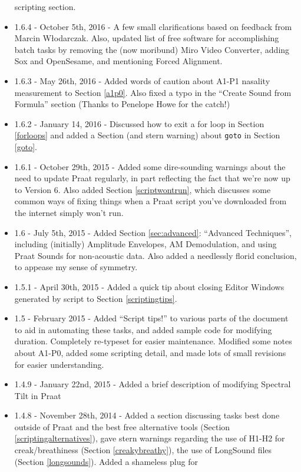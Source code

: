 \documentclass[11pt]{article}
\begin{document}
\begin{itemize}
  scripting section.
\item
  1.6.4 - October 5th, 2016 - A few small clarifications based on
  feedback from Marcin Włodarczak. Also, updated list of free software
  for accomplishing batch tasks by removing the (now moribund) Miro
  Video Converter, adding Sox and OpenSesame, and mentioning Forced
  Alignment.
\item
  1.6.3 - May 26th, 2016 - Added words of caution about A1-P1 nasality
  measurement to Section \ref{a1p0}. Also fixed a typo in the ``Create
  Sound from Formula'' section (Thanks to Penelope Howe for the catch!)
\item
  1.6.2 - January 14, 2016 - Discussed how to exit a for loop in Section
  \ref{forloops} and added a Section (and stern warning) about
  \texttt{goto} in Section \ref{goto}.
\item
  1.6.1 - October 29th, 2015 - Added some dire-sounding warnings about
  the need to update Praat regularly, in part reflecting the fact that
  we're now up to Version 6. Also added Section \ref{scriptwontrun},
  which discusses some common ways of fixing things when a Praat script
  you've downloaded from the internet simply won't run.
\item
  1.6 - July 5th, 2015 - Added Section \ref{sec:advanced}: ``Advanced
  Techniques'', including (initially) Amplitude Envelopes, AM
  Demodulation, and using Praat Sounds for non-acoustic data. Also added
  a needlessly florid conclusion, to appease my sense of symmetry.
\item
  1.5.1 - April 30th, 2015 - Added a quick tip about closing Editor
  Windows generated by script to Section \ref{scriptingtips}.
\item
  1.5 - February 2015 - Added ``Script tips!'' to various parts of the
  document to aid in automating these tasks, and added sample code for
  modifying duration. Completely re-typeset for easier maintenance.
  Modified some notes about A1-P0, added some scripting detail, and made
  lots of small revisions for easier understanding.
\item
  1.4.9 - January 22nd, 2015 - Added a brief description of modifying
  Spectral Tilt in Praat
\item
  1.4.8 - November 28th, 2014 - Added a section discussing tasks best
  done outside of Praat and the best free alternative tools (Section
  \ref{scriptingalternatives}), gave stern warnings regarding the use of
  H1-H2 for creak/breathiness (Section \ref{creakybreathy}), the use of
  LongSound files (Section \ref{longsounds}). Added a shameless plug for

\end{itemize}
\end{document}

